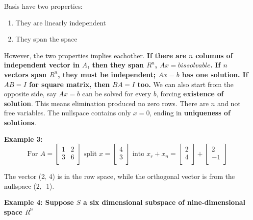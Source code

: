 Basis have two properties:
\begin{enumerate}
    \item They are linearly independent 
    \item They span the space
\end{enumerate}

However, the two properties implies eachother. \textbf{If there are \(n\) columns of independent vector in \(A\), then they span \(R^n\), \(Ax=b is solvable\). If \(n\) vectors span \(R^n\), they must be independent; \(Ax=b\) has one solution. If \(AB = I\) for square matrix, then \(BA = I\) too.   } 
We can also start from the opposite side, say \(Ax=b\) can be solved for every \(b\), forcing \textbf{existence of solution}. This means elimination produced no zero rows. There are \(n\) and not free variables. The nullspace contains only \(x=0\), ending in \textbf{uniqueness of solutions}. 

\textbf{Example 3:}
\[
    \text{For } A = 
    \begin{bmatrix}
        1 & 2  \\
        3 & 6  \\
    \end{bmatrix}
    \text{ split } x = 
    \begin{bmatrix}
         4 \\
         3 \\
    \end{bmatrix}
    \text{ into } x_r + x_n = 
    \begin{bmatrix}
         2 \\
         4 \\
    \end{bmatrix}
    + 
    \begin{bmatrix}
         2 \\
         -1 \\
    \end{bmatrix}
\] 

The vector (2, 4) is in the row space, while the orthogonal vector is from the nullspace (2, -1). 

\textbf{Example 4: Suppose \(S\) a six dimensional subspace of nine-dimensional space \(R^9\) }

